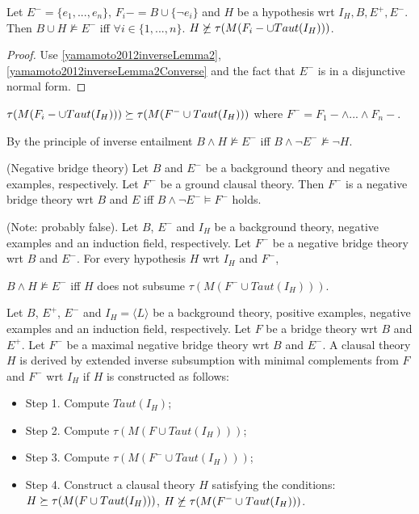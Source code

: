\begin{lemma}
Let $E^{-}=\{e_1,...,e_n\}$, $F_i-=B \cup \{\neg e_i\}$ and $H$ be
a hypothesis wrt $I_H, B, E^{+}, E^{-}$.
Then $B \cup H \not\models E^{-}$ iff
$\forall i \in \{1,...,n\}.$ $H \not\succeq \tau(M(F_i- \cup Taut(I_H)))$.
\end{lemma}

\begin{proof}
Use \ref{yamamoto2012inverseLemma2}, \ref{yamamoto2012inverseLemma2Converse} and the fact that $E^{-}$ is in a disjunctive normal form.
\end{proof}

\begin{conjecture}
$\tau(M(F_i- \cup Taut(I_H))) \succeq \tau(M(F^{-} \cup Taut(I_H)))$
where $F^{-}=F_1- \wedge ... \wedge F_n-$.
\end{conjecture}

By the principle of inverse entailment
$B \wedge H \not\models E^{-}$ iff
$B \wedge \neg E^{-} \not\models \neg H$.

\begin{defn}
(Negative bridge theory) Let $B$ and $E^{-}$ be a background theory and negative examples, respectively. Let $F^{-}$ be a ground clausal theory. Then $F^{-}$ is a negative bridge theory wrt $B$ and $E$ iff $B \wedge \neg E^{-} \models F^{-}$ holds.
\end{defn}

\begin{conjecture}\label{subsumptionConjectureNegativeExamples}
(Note: probably false).
Let $B$, $E^{-}$ and $I_H$ be a background theory, negative examples and an induction field, respectively. Let $F^{-}$ be a negative bridge theory wrt $B$ and $E^{-}$. For every hypothesis $H$ wrt $I_H$ and $F^{-}$,

$B \wedge H \not\models E^{-}$ iff $H$ does not subsume
$\tau(M(F^{-} \cup Taut(I_H)))$.
\end{conjecture}

\begin{defn}
Let $B$, $E^{+}$, $E^{-}$ and $I_H = \langle L \rangle$ be a background theory, positive examples, negative examples and an induction field, respectively.
Let $F$ be a bridge theory wrt $B$ and $E^{+}$. Let $F^{-}$ be a maximal negative bridge theory wrt $B$ and $E^{-}$. A clausal theory $H$ is derived
by extended inverse subsumption with minimal complements from $F$ and $F^{-}$ wrt $I_H$ if $H$ is constructed as
follows:
\begin{itemize}
\item Step 1. Compute $Taut(I_H)$;
\item Step 2. Compute $\tau(M(F \cup Taut(I_H)))$;
\item Step 3. Compute $\tau(M(F^{-} \cup Taut(I_H)))$;
\item Step 4. Construct a clausal theory $H$ satisfying the conditions:
$H \succeq \tau(M(F \cup Taut(I_H)))$,
$H \not\succeq \tau(M(F^{-} \cup Taut(I_H)))$.
\end{itemize}
\end{defn}
